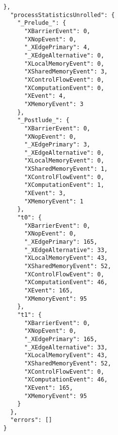 \begin{multicols*}{2}
\begin{lstlisting}[basicstyle=\footnotesize\ttfamily]
  },
  "processStatisticsUnrolled": {
    "_Prelude_": {
      "XBarrierEvent": 0,
      "XNopEvent": 0,
      "_XEdgePrimary": 4,
      "_XEdgeAlternative": 0,
      "XLocalMemoryEvent": 0,
      "XSharedMemoryEvent": 3,
      "XControlFlowEvent": 0,
      "XComputationEvent": 0,
      "XEvent": 4,
      "XMemoryEvent": 3
    },
    "_Postlude_": {
      "XBarrierEvent": 0,
      "XNopEvent": 0,
      "_XEdgePrimary": 3,
      "_XEdgeAlternative": 0,
      "XLocalMemoryEvent": 0,
      "XSharedMemoryEvent": 1,
      "XControlFlowEvent": 0,
      "XComputationEvent": 1,
      "XEvent": 3,
      "XMemoryEvent": 1
    },
    "t0": {
      "XBarrierEvent": 0,
      "XNopEvent": 0,
      "_XEdgePrimary": 165,
      "_XEdgeAlternative": 33,
      "XLocalMemoryEvent": 43,
      "XSharedMemoryEvent": 52,
      "XControlFlowEvent": 0,
      "XComputationEvent": 46,
      "XEvent": 165,
      "XMemoryEvent": 95
    },
    "t1": {
      "XBarrierEvent": 0,
      "XNopEvent": 0,
      "_XEdgePrimary": 165,
      "_XEdgeAlternative": 33,
      "XLocalMemoryEvent": 43,
      "XSharedMemoryEvent": 52,
      "XControlFlowEvent": 0,
      "XComputationEvent": 46,
      "XEvent": 165,
      "XMemoryEvent": 95
    }
  },
  "errors": []
}
\end{lstlisting}
\end{multicols*}
